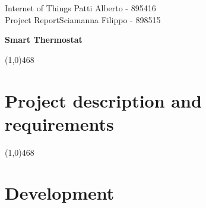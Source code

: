 \documentclass[letterpaper, 11pt]{article}
\newcommand{\hl}{\begin{center} \line(1,0){468} \end{center}} %
\newcommand{\ctitle}[1]{\begin{center} \huge{\textbf{#1}} \end{center}} %
\begin{document}
\noindent
Internet of Things \hfill  Patti Alberto - 895416\\
Project Report\hfill Sciamanna Filippo - 898515


\ctitle{Smart Thermostat}


\hl
\section*{Project description and requirements}
 

\hl 

\section*{Development}
 
\end{document}

